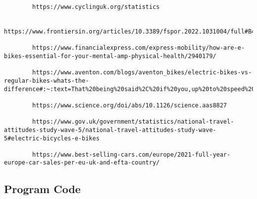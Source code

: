 \documentclass{mcm}
\numberwithin{figure}{section}
\numberwithin{table}{section}
\numberwithin{equation}{section}
\begin{document}
\begin{lstlisting}
        https://www.cyclinguk.org/statistics 
        
        https://www.frontiersin.org/articles/10.3389/fspor.2022.1031004/full#B4

        https://www.financialexpress.com/express-mobility/how-are-e-bikes-essential-for-your-mental-amp-physical-health/2940179/

        https://www.aventon.com/blogs/aventon_bikes/electric-bikes-vs-regular-bikes-whats-the-difference#:~:text=That%20being%20said%2C%20if%20you,up%20to%20speed%20after%20coasting

        https://www.science.org/doi/abs/10.1126/science.aas8827

        https://www.gov.uk/government/statistics/national-travel-attitudes-study-wave-5/national-travel-attitudes-study-wave-5#electric-bicycles-e-bikes

        https://www.best-selling-cars.com/europe/2021-full-year-europe-car-sales-per-eu-uk-and-efta-country/
    \end{lstlisting}

    \subsection{Program Code}
\end{document}
